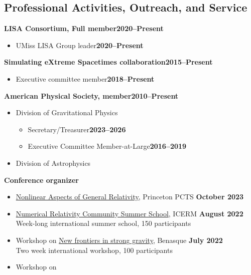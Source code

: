 \documentclass[margin,line]{res}
\begin{document}
\begin{resume}
  \section{\sc Professional Activities, Outreach, and Service}
   {\bf LISA Consortium, Full member}\hfill{\bf 2020--Present}
  \begin{itemize}
    \item[] UMiss LISA Group leader\hfill{\bf 2020--Present}
  \end{itemize}
  {\bf Simulating eXtreme Spacetimes collaboration}\hfill{\bf 2015--Present}
  \begin{itemize}
    \item[] Executive committee member\hfill{\bf 2018--Present}
  \end{itemize}
  {\bf American Physical Society, member}\hfill{\bf 2010--Present}
  \begin{itemize}
    \item[] Division of Gravitational Physics
      \begin{itemize}
        \item[] Secretary/Treasurer\hfill{\bf 2023--2026}
        \item[] Executive Committee Member-at-Large\hfill{\bf 2016--2019}
      \end{itemize}
    \item[] Division of Astrophysics
  \end{itemize}
  {\bf Conference organizer}
  \vspace*{.05in}
  \begin{itemize}
    \item[]
      \href{https://pcts.princeton.edu/events/2023/nonlinear-aspects-general-relativity}
      {Nonlinear Aspects of General Relativity},
      Princeton PCTS \hfill {\bf October 2023}
    \item[]
      \href{https://icerm.brown.edu/events/re-22-f20w1/}
      {Numerical Relativity Community Summer School},
      ICERM \hfill {\bf August 2022} \\
      \hspace*{1em} Week-long international summer school, 150 participants
    \item[] Workshop on
      \href{https://www.benasque.org/2022relativity/}{New frontiers in
        strong gravity},
      Benasque \hfill {\bf July 2022} \\
      \hspace*{1em} Two week international workshop, 100 participants
    \item[] Workshop on

\end{itemize}
\end{resume}
\end{document}
